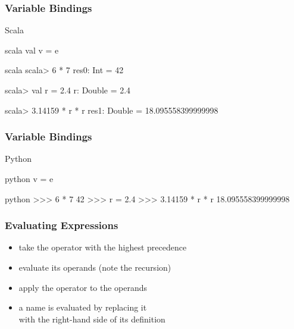\documentclass[dvipsnames]{beamer}
\theoremstyle{plain}
\begin{document}
\begin{frame}[fragile]
  \frametitle{Variable Bindings}

  \begin{block}{Scala}
    \begin{pygments}{scala}
val v = e
    \end{pygments}
  \end{block}

  \pause
  \begin{example}[Scala]
    \begin{pygments}{scala}
scala> 6 * 7
res0: Int = 42

scala> val r = 2.4
r: Double = 2.4

scala> 3.14159 * r * r
res1: Double = 18.095558399999998
    \end{pygments}
  \end{example}
\end{frame}

\begin{frame}[fragile]
  \frametitle{Variable Bindings}

  \begin{block}{Python}
    \begin{pygments}{python}
v = e
    \end{pygments}
  \end{block}

  \pause
  \begin{example}[Python]
    \begin{pygments}{python}
>>> 6 * 7
42
>>> r = 2.4
>>> 3.14159 * r * r
18.095558399999998
    \end{pygments}
  \end{example}
\end{frame}

\begin{frame}
  \frametitle{Evaluating Expressions}

  \begin{itemize}
    \item take the operator with the highest precedence
    \item evaluate its operands (note the recursion)
    \item apply the operator to the operands

    \pause
    \medskip
    \item a name is evaluated by replacing it\\
      with the right-hand side of its definition
  \end{itemize}
\end{frame}
\end{document}
